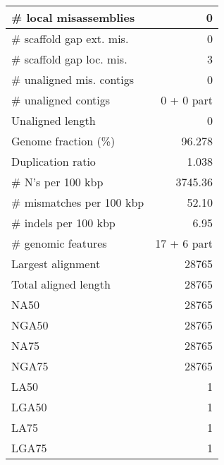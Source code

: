 \documentclass[12pt,a4paper]{article}
\begin{document}
\begin{table}[ht]
\begin{center}
\begin{tabular}{|l*{1}{|r}|}
\# local misassemblies & 0 \\ \hline
\# scaffold gap ext. mis. & 0 \\ \hline
\# scaffold gap loc. mis. & 3 \\ \hline
\# unaligned mis. contigs & 0 \\ \hline
\# unaligned contigs & 0 + 0 part \\ \hline
Unaligned length & 0 \\ \hline
Genome fraction (\%) & 96.278 \\ \hline
Duplication ratio & 1.038 \\ \hline
\# N's per 100 kbp & 3745.36 \\ \hline
\# mismatches per 100 kbp & 52.10 \\ \hline
\# indels per 100 kbp & 6.95 \\ \hline
\# genomic features & 17 + 6 part \\ \hline
Largest alignment & 28765 \\ \hline
Total aligned length & 28765 \\ \hline
NA50 & 28765 \\ \hline
NGA50 & 28765 \\ \hline
NA75 & 28765 \\ \hline
NGA75 & 28765 \\ \hline
LA50 & 1 \\ \hline
LGA50 & 1 \\ \hline
LA75 & 1 \\ \hline
LGA75 & 1 \\ \hline
\end{tabular}
\end{center}
\end{table}
\end{document}
